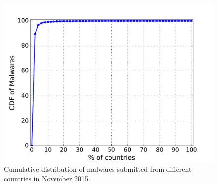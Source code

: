 \begin{figure}[!htb]
  \includegraphics[width=\linewidth]{figure/country}
{Cumulative distribution of malwares submitted from different countries in November 2015.}
\endminipage\hfill

\vspace{-0.1in}
\end{figure}